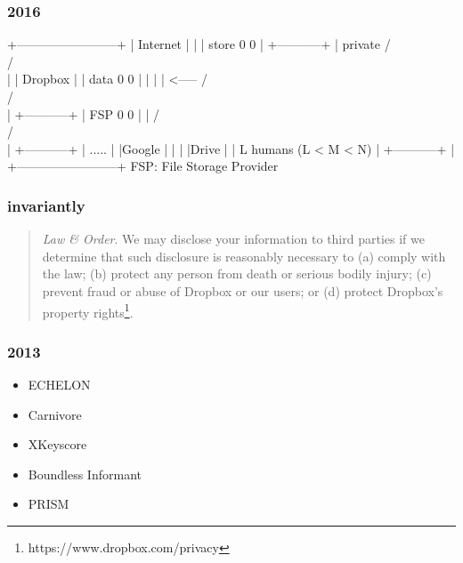 \begin{frame}[fragile]
  \frametitle{2016}
  {\scriptsize
  \begin{semiverbatim}
   +------------------------+
   | Internet               |
   |                        | store    0   0
   |  +-----------+         | private / \\ / \\
   |  | Dropbox   |         |  data    0   0
   |  |           |         | <-----  / \\ / \\
   |  +-----------+         |   FSP    0   0
   |                        |         / \\ / \\
   |          +-----------+ |          .....
   |          |Google     | |
   |          |Drive      | |             L humans (L < M < N)
   |          +-----------+ |
   +------------------------+      FSP: File Storage Provider
  \end{semiverbatim}
  }
\end{frame}

\begin{frame}
  \frametitle{invariantly}
  {\small
  \begin{quote}
    \emph{Law \& Order}. We may disclose your information to third
    parties if we determine that such disclosure is reasonably
    necessary to (a) comply with the law; (b) protect any person from
    death or serious bodily injury; (c) prevent fraud or abuse of
    Dropbox or our users; or (d) protect Dropbox's property
    rights\footnote{https://www.dropbox.com/privacy}.
  \end{quote}
  }
\end{frame}

\begin{frame}
  \frametitle{2013}

  \begin{itemize}
  \item ECHELON
  \item Carnivore
  \item XKeyscore
  \item Boundless Informant
  \item PRISM
  \end{itemize}
\end{frame}